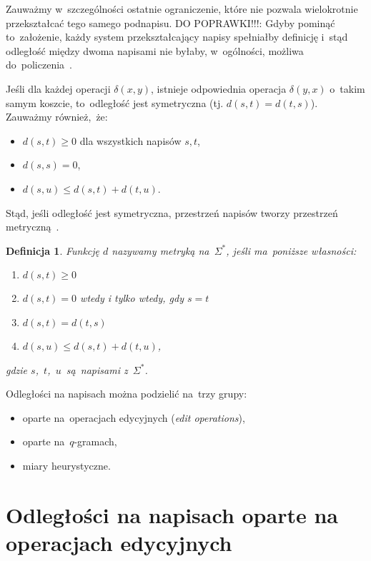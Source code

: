 \documentclass[12pt, twoside, openany]{report}
\theoremstyle{plain}
\newtheorem{defi}{Definicja}[section]
\begin{document}
Zauważmy w~szczególności ostatnie ograniczenie, które nie pozwala wielokrotnie przekształcać tego samego podnapisu. DO POPRAWKI!!!: Gdyby pominąć to~założenie, każdy system przekształcający napisy spełniałby definicję i~stąd odległość między dwoma napisami nie byłaby, w~ogólności, możliwa do~policzenia~\cite{Navarro2001:guidedtour}.

Jeśli dla każdej operacji $\delta(x,y)$, istnieje odpowiednia operacja $\delta(y,x)$ o~takim samym koszcie, to~odległość jest symetryczna (tj. $d(s,t) = d(t,s)$). Zauważmy również,~że:
\begin{itemize}
\item $d(s,t) \geq 0$ dla wszystkich napisów $s, t$,
\item $d(s,s) = 0$,
\item $d(s,u) \leq d(s,t) + d(t,u)$.
\end{itemize}
Stąd, jeśli odległość jest symetryczna, przestrzeń napisów tworzy przestrzeń metryczną~\cite{Navarro2001:guidedtour}.

\begin{defi}
\label{def:001}
Funkcję $d$ nazywamy \emph{metryką} na~$\Sigma^*$, jeśli ma~poniższe własności:
\begin{enumerate}
\item \label{def:001a} $d(s,t) \geq 0$
\item \label{def:001b} $d(s,t) = 0$ wtedy i tylko wtedy, gdy $s = t$
\item \label{def:001c} $d(s,t) = d(t,s)$
\item \label{def:001d} $d(s,u) \leq d(s,t) + d(t,u)$,
\end{enumerate}
gdzie $s$,~$t$,~$u$~są~napisami z~$\Sigma^*$.


\end{defi}



Odległości na napisach można podzielić na~trzy grupy:
\begin{itemize}
\item oparte na~operacjach edycyjnych (\emph{edit operations}),
\item oparte na~$q$-gramach,
\item miary heurystyczne.
\end{itemize}


\section{Odległości na napisach oparte na operacjach edycyjnych}
\end{document}
